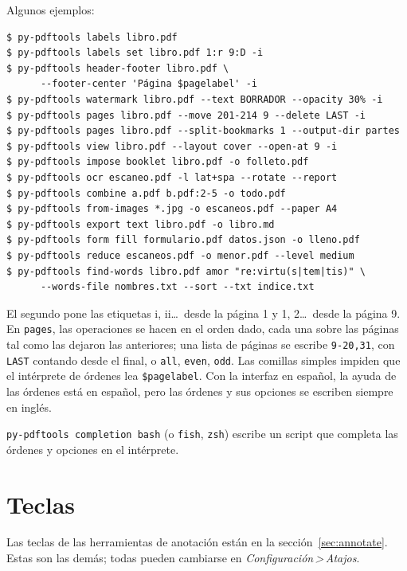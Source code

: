 \documentclass[12pt,
              article,
              oneside
              ]{memoir}
\newcommand*{\menu}[1]{\textit{#1}}
\newcommand*{\then}{\,>\,}
\begin{document}
\noindent Algunos ejemplos:

\begin{verbatim}
$ py-pdftools labels libro.pdf
$ py-pdftools labels set libro.pdf 1:r 9:D -i
$ py-pdftools header-footer libro.pdf \
      --footer-center 'Página $pagelabel' -i
$ py-pdftools watermark libro.pdf --text BORRADOR --opacity 30% -i
$ py-pdftools pages libro.pdf --move 201-214 9 --delete LAST -i
$ py-pdftools pages libro.pdf --split-bookmarks 1 --output-dir partes
$ py-pdftools view libro.pdf --layout cover --open-at 9 -i
$ py-pdftools impose booklet libro.pdf -o folleto.pdf
$ py-pdftools ocr escaneo.pdf -l lat+spa --rotate --report
$ py-pdftools combine a.pdf b.pdf:2-5 -o todo.pdf
$ py-pdftools from-images *.jpg -o escaneos.pdf --paper A4
$ py-pdftools export text libro.pdf -o libro.md
$ py-pdftools form fill formulario.pdf datos.json -o lleno.pdf
$ py-pdftools reduce escaneos.pdf -o menor.pdf --level medium
$ py-pdftools find-words libro.pdf amor "re:virtu(s|tem|tis)" \
      --words-file nombres.txt --sort --txt indice.txt
\end{verbatim}

\noindent{}%
El segundo pone las etiquetas i, ii\ldots\ desde la página 1 y
1, 2\ldots\ desde la página 9. En \texttt{pages}, las operaciones se hacen
en el orden dado, cada una sobre las páginas tal como las dejaron las
anteriores; una lista de páginas se escribe \texttt{9-20,31}, con
\texttt{LAST} contando desde el final, o \texttt{all}, \texttt{even},
\texttt{odd}. Las comillas simples impiden que el intérprete de órdenes
lea \texttt{\$pagelabel}. Con la interfaz en español, la ayuda de las
órdenes está en español, pero las órdenes y sus opciones se escriben
siempre en inglés.

%
\texttt{py-pdftools completion bash} (o \texttt{fish}, \texttt{zsh})
escribe un script que completa las órdenes y opciones en el intérprete.

\section{Teclas}
\label{sec:keys}

%
Las teclas de las herramientas de anotación están en la
sección~\ref{sec:annotate}. Estas son las demás; todas pueden cambiarse en
\menu{Configuración\then Atajos}.
\end{document}
